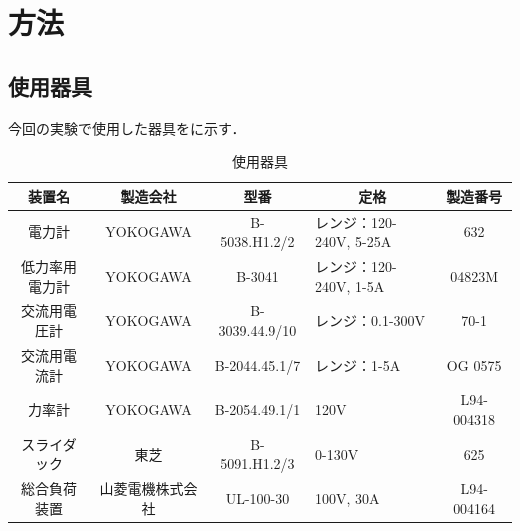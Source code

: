 \clearpage
\section{方法}
\subsection{使用器具}
今回の実験で使用した器具をに示す．
\begin{table}[h]
\centering
\caption{使用器具}
\label{tab:kigu}
\begin{tabular}{ccclc}
\hline
装置名     & 製造会社     & 型番             & \multicolumn{1}{c}{定格} & 製造番号       \\ \hline
電力計     & YOKOGAWA & B-5038.H1.2/2  & レンジ：120-240V, 5-25A    & 632        \\
低力率用電力計 & YOKOGAWA & B-3041         & レンジ：120-240V, 1-5A     & 04823M     \\
交流用電圧計  & YOKOGAWA & B-3039.44.9/10 & レンジ：0.1-300V           & 70-1       \\
交流用電流計  & YOKOGAWA & B-2044.45.1/7  & レンジ：1-5A               & OG 0575    \\
力率計     & YOKOGAWA & B-2054.49.1/1  & 120V                   & L94-004318 \\
スライダック  & 東芝       & B-5091.H1.2/3  & 0-130V                 & 625        \\
総合負荷装置  & 山菱電機株式会社 & UL-100-30      & 100V, 30A              & L94-004164 \\ \hline
\end{tabular}
\end{table}

